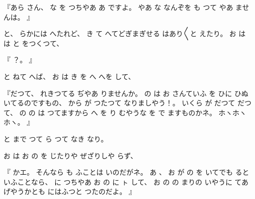 『あら
さん、
な
を
つちやあ
あ
ですよ。
やあ
な
なんぞを
も
つて
やあ
ませんは。
』

と、
らかには
へたれど、
き
て
へてどぎまぎせる
はあり〳〵と
えたり。
お
は
は
と
をつくつて、

『
？。
』

と
ねて
へば、
お
は
き
を
へ
へを
して、

『だつて、
れきつてる
ぢやあ
りませんか。
の
は
お
さんていふ
を
ひに
ひぬいてるのですもの、
から
が
つたつて
なりましやう！。
いくら
が
だつて
だつて、
の
の
は
つてますから
へ
を
り
むやうな
を
で
ますものかネ。
ホヽホヽホヽ。
』

と
まで
つて
ら
つて
なき
なり。

お
は
お
の
を
じたりや
ぜざりしや
らず、

『
かエ。
そんなら
も
ふことは
いのだがネ。
あ
、
お
が
の
を
いてでも
るといふことなら、
に
つちやあ
お
の
に
ㇳ
して、
お
の
の
まりの
いやうに
てあげやうかとも
にはふつと
つたのだよ。
』

